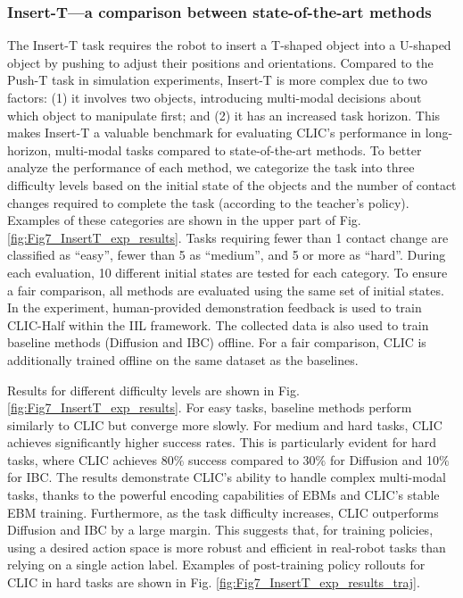 \subsubsection{Insert-T—a comparison between state-of-the-art methods}
The Insert-T task requires the robot to insert a T-shaped object into a U-shaped object by pushing to adjust their positions and orientations.
Compared to the Push-T task in simulation experiments, Insert-T is more complex due to two factors: (1) it involves two objects, introducing multi-modal decisions about which object to manipulate first; and (2) it has an increased task horizon. This makes Insert-T a valuable benchmark for evaluating CLIC's performance in long-horizon, multi-modal tasks compared to state-of-the-art methods. 
To better analyze the performance of each method, we categorize the task into three difficulty levels based on the initial state of the objects and the number of contact changes required to complete the task (according to the teacher’s policy).  Examples of these categories are shown in the upper part of Fig. \ref{fig:Fig7_InsertT_exp_results}.
Tasks requiring fewer than 1 contact change are classified as ``easy”, fewer than 5 as ``medium”, and 5 or more as ``hard”. 
During each evaluation, 10 different initial states are tested for each category. To ensure a fair comparison, all methods are evaluated using the same set of initial states.
In the experiment, human-provided demonstration feedback is used to train CLIC-Half within the IIL framework. The collected data is also used to train baseline methods (Diffusion and IBC) offline. For a fair comparison, CLIC is additionally trained offline on the same dataset as the baselines.

Results for different difficulty levels are shown in Fig. \ref{fig:Fig7_InsertT_exp_results}. For easy tasks, baseline methods perform similarly to CLIC but converge more slowly. For medium and hard tasks, CLIC achieves significantly higher success rates. This is particularly evident for hard tasks, where CLIC achieves 80$\%$ success compared to 30$\%$ for Diffusion and 10$\%$ for IBC. 
The results demonstrate CLIC's ability to handle complex multi-modal tasks, thanks to the powerful encoding capabilities of EBMs and CLIC's stable EBM training. 
Furthermore, as the task difficulty increases, CLIC outperforms Diffusion and IBC by a large margin. This suggests that, for training policies, using a desired action space is more robust and efficient in real-robot tasks than relying on a single action label.
 Examples of post-training policy rollouts for CLIC in hard tasks are shown in Fig. \ref{fig:Fig7_InsertT_exp_results_traj}.

